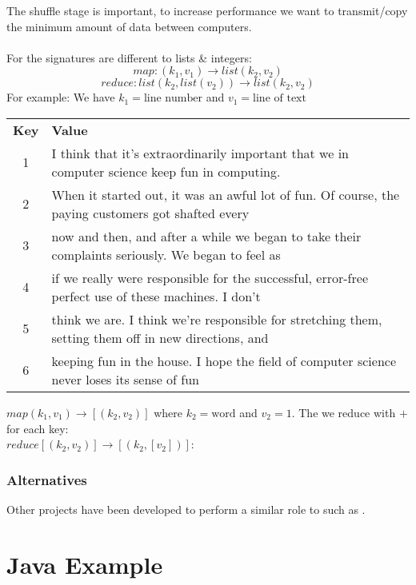 \documentclass{report}
\begin{document}
        The shuffle stage is important, to increase performance we want to transmit/copy the minimum amount of data between computers.
        \\
        \\ For  the signatures are different to lists \& integers:
        \[map: (k_1,v_1) \to list(k_2, v_2)\]
        \[reduce: list(k_2, list(v_2)) \to list(k_2, v_2)\]
        For example:
        We have $k_1 = \text{line number}$ and $v_1 = \text{line of text}$
        \begin{center}
            \begin{tabular}{c l}
                \textbf{Key} & \textbf{Value} \\
                1 & I think that it's extraordinarily important that we in computer science keep fun in computing. \\
                2 & When it started out, it was an awful lot of fun. Of course, the paying customers got shafted every \\
                3 & now and then, and after a while we began to take their complaints seriously. We began to feel as \\
                4 & if we really were responsible for the successful, error-free perfect use of these machines. I don't \\
                5 & think we are. I think we're responsible for stretching them, setting them off in new directions, and \\
                6 & keeping fun in the house. I hope the field of computer science never loses its sense of fun \\
            \end{tabular}
        \end{center}
        $map (k_1, v_1) \to [(k_2, v_2)]$ where $k_2 = \text{word}$ and $v_2 = \text{1}$.
        The we reduce with $+$ for each key:
        \\ $reduce [(k_2, v_2)] \to [(k_2, [v_2])]$:
    
        \subsubsection*{Alternatives}
            Other projects have been developed to perform a similar role to  such as .

    \section*{Java Example}
\end{document}
